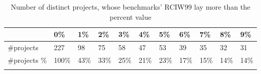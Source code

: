 \documentclass{seal_thesis}
\begin{document}
\begin{table}[H]
	\centering
	\caption{Number of distinct projects, whose benchmarks’ RCIW99 lay more than the percent value}
	\label{table:table2}
	\begin{tabular}{lllllllllll}
		\hline
		\rowcolor[HTML]{FFCCC9} 
		\multicolumn{1}{|l|}{\cellcolor[HTML]{FFCCC9}Percentage} & \multicolumn{1}{l|}{\cellcolor[HTML]{FFCCC9}0\%}  & \multicolumn{1}{l|}{\cellcolor[HTML]{FFCCC9}1\%}  & \multicolumn{1}{l|}{\cellcolor[HTML]{FFCCC9}2\%}  & \multicolumn{1}{l|}{\cellcolor[HTML]{FFCCC9}3\%}  & \multicolumn{1}{l|}{\cellcolor[HTML]{FFCCC9}4\%}  & \multicolumn{1}{l|}{\cellcolor[HTML]{FFCCC9}5\%}  & \multicolumn{1}{l|}{\cellcolor[HTML]{FFCCC9}6\%}  & \multicolumn{1}{l|}{\cellcolor[HTML]{FFCCC9}7\%}  & \multicolumn{1}{l|}{\cellcolor[HTML]{FFCCC9}8\%}  & \multicolumn{1}{l|}{\cellcolor[HTML]{FFCCC9}9\%}   \\ \hline
		\multicolumn{1}{|l|}{\#projects}                         & \multicolumn{1}{l|}{227}                          & \multicolumn{1}{l|}{98}                           & \multicolumn{1}{l|}{75}                           & \multicolumn{1}{l|}{58}                           & \multicolumn{1}{l|}{47}                           & \multicolumn{1}{l|}{53}                           & \multicolumn{1}{l|}{39}                           & \multicolumn{1}{l|}{35}                           & \multicolumn{1}{l|}{32}                           & \multicolumn{1}{l|}{31}                            \\ \hline
		\multicolumn{1}{|l|}{\#projects \%}                      & \multicolumn{1}{l|}{100\%}                        & \multicolumn{1}{l|}{43\%}                         & \multicolumn{1}{l|}{33\%}                         & \multicolumn{1}{l|}{25\%}                         & \multicolumn{1}{l|}{21\%}                         & \multicolumn{1}{l|}{23\%}                         & \multicolumn{1}{l|}{17\%}                         & \multicolumn{1}{l|}{15\%}                         & \multicolumn{1}{l|}{14\%}                         & \multicolumn{1}{l|}{14\%}                          \\ \hline
		&                                                   &                                                   &                                                   &                                                   &                                                   &                                                   &                                                   &                                                   &                                                   &                                                    \\ \hline

\end{tabular}
\end{table}
\end{document}
